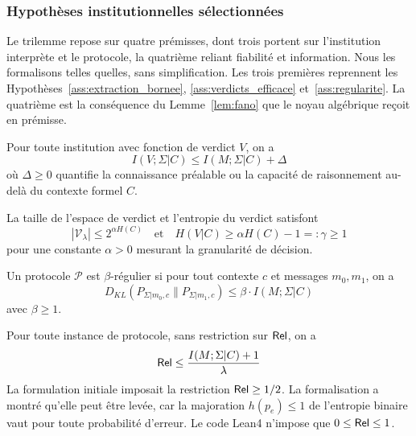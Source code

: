 \begin{sloppypar}
\subsubsection{Hypoth\`eses institutionnelles s\'electionn\'ees}
\label{subsubsec:hypotheses_formaliser}

Le trilemme repose sur quatre pr\'emisses, dont trois portent sur
l'institution interpr\`ete et le protocole, la quatri\`eme reliant fiabilit\'e et
information. Nous les formalisons telles quelles, sans simplification. Les trois premi\`eres
reprennent les Hypoth\`eses~\ref{ass:extraction_bornee}, \ref{ass:verdicts_efficace}
et~\ref{ass:regularite}. La quatri\`eme est la cons\'equence du Lemme~\ref{lem:fano} que le noyau
alg\'ebrique re\c{c}oit en pr\'emisse.

\begin{assumption}\label{ass:fano_axiom}
Pour toute institution avec fonction de verdict $V$, on a
\begin{equation}
I(V;\Sigma|C) \le I(M;\Sigma|C) + \Delta
\end{equation}
o\`u $\Delta \ge 0$ quantifie la connaissance pr\'ealable ou la capacit\'e de
raisonnement au-del\`a du contexte formel $C$.
\end{assumption}

\begin{assumption}\label{ass:pinsker_axiom}
La taille de l'espace de verdict et l'entropie du verdict satisfont
\begin{equation}
|\mathcal{V}_\lambda| \le 2^{\alpha H(C)}
\quad\text{et}\quad
H(V|C) \ge \alpha H(C) - 1 =: \gamma \ge 1
\end{equation}
pour une constante $\alpha > 0$ mesurant la granularit\'e de d\'ecision.
\end{assumption}

\begin{assumption}[R\'egularit\'e]\label{ass:extraction_axiom}
Un protocole $\mathcal{P}$ est $\beta$-r\'egulier si pour tout contexte $c$
et messages $m_0, m_1$, on a
\begin{equation}
D_{KL}(P_{\Sigma|m_0,c} \| P_{\Sigma|m_1,c}) \le \beta \cdot I(M;\Sigma|C)
\end{equation}
avec $\beta \ge 1$.
\end{assumption}

\begin{assumption}\label{ass:reliability_axiom}
Pour toute instance de protocole, sans restriction sur $\mathsf{Rel}$, on a
\begin{equation}
\mathsf{Rel} \le \frac{I(M;\Sigma|C) + 1}{\lambda}
\end{equation}
La formulation initiale imposait la restriction $\mathsf{Rel} \ge 1/2$. La
formalisation a montr\'e qu'elle peut \^etre lev\'ee, car la majoration
$h(p_e) \le 1$ de l'entropie binaire vaut pour toute probabilit\'e d'erreur.
Le code Lean4 n'impose que $0 \le \mathsf{Rel} \le 1$.
\end{assumption}


\end{sloppypar}
